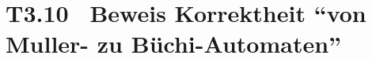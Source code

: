 \documentclass[fontsize=11pt, twoside=false, numbers=autoenddot]{scrbook}
\begin{document}
%
%    
%
\section*{T3.10~ Beweis Korrektheit "`von Muller- zu Büchi-Automaten"'}
\end{document}
